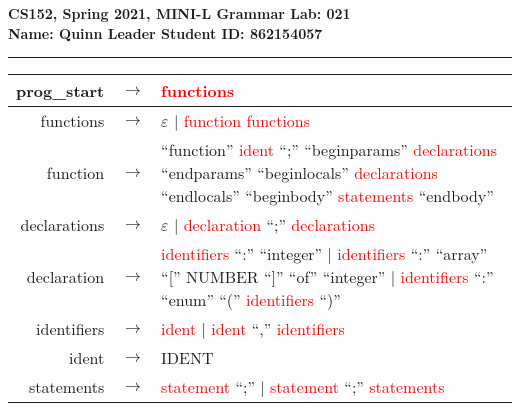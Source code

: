 \documentclass{article}[12pt]
\newcommand{\prodrule}[1]{#1}
\newcommand{\nonterm}[1]{\textcolor{red}{#1}}
\newcommand{\term}[1]{#1}
\begin{document}
{
\noindent \large \bf
CS152, Spring 2021,
MINI-L Grammar
\hfill
Lab: 021\\
Name: Quinn Leader \hfill
Student ID: 862154057 \\
\noindent\rule{\textwidth}{1pt}
}

\begin{tabular}{r c p{10cm}}
	\prodrule{prog\_start} & $\rightarrow$ &
		      \nonterm{functions} \\
	\hline

	\prodrule{functions} & $\rightarrow$ &
		        $\varepsilon$
		$\vert$ \nonterm{function} \nonterm{functions} \\
	\hline

	\prodrule{function} & $\rightarrow$ &
		        \term{``function''} \nonterm{ident} \term{``;''} \term{``beginparams''} \nonterm{declarations} \term{``endparams''}
		        \term{``beginlocals''} \nonterm{declarations} \term{``endlocals''} \term{``beginbody''} \nonterm{statements} \term{``endbody''} \\
	\hline

	\prodrule{declarations} & $\rightarrow$ &
		        $\varepsilon$
		$\vert$ \nonterm{declaration} \term{``;''} \nonterm{declarations} \\
	\hline

	\prodrule{declaration} & $\rightarrow$ &
		        \nonterm{identifiers} \term{``:''} \term{``integer''} \newline
        $\vert$ \nonterm{identifiers} \term{``:''} \term{``array''} \term{``[''} \term{NUMBER} \term{``]''}
		        \term{``of''} \term{``integer''} \newline
		$\vert$ \nonterm{identifiers} \term{``:''} \term{``enum''} \term{``(''} \nonterm{identifiers} \term{``)''} \\
	\hline

	\prodrule{identifiers} & $\rightarrow$ &
		        \nonterm{ident} \newline
		$\vert$ \nonterm{ident} \term{``,''} \nonterm{identifiers} \\
	\hline

	\prodrule{ident} & $\rightarrow$ &
		        \term{IDENT} \\
	\hline

	\prodrule{statements} & $\rightarrow$ &
		        \nonterm{statement} \term{``;''}
		$\vert$ \nonterm{statement} \term{``;''} \nonterm{statements} \\
	\hline


\end{tabular}
\end{document}
